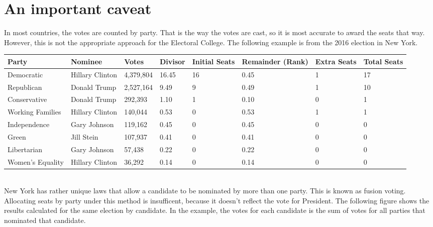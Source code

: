 \documentclass{article}
\begin{document}
    \section{An important caveat}%

    In most countries, the votes are counted by party. That is the way the votes are cast, so it is most accurate to award the seats that way. However, this is not the appropriate approach for the Electoral College. The following example is from the 2016 election in New York.\\

    \begin{adjustbox}{center}
    \begin{tabular}{ |l|l|l|l|l|l|l|l| }
        \hline
        Party & Nominee & Votes & Divisor & Initial Seats & Remainder (Rank) & Extra Seats & Total Seats \\
        \hline
        Democratic & Hillary Clinton & 4,379,804 & 16.45 & 16 & 0.45 & 1 & 17 \\
        \hline
        Republican & Donald Trump & 2,527,164 & 9.49 & 9 & 0.49 & 1 & 10 \\
        \hline
        Conservative & Donald Trump & 292,393 & 1.10 & 1 & 0.10 & 0 & 1 \\
        \hline
        Working Families & Hillary Clinton & 140,044 & 0.53 & 0 & 0.53 & 1 & 1 \\
        \hline
        Independence & Gary Johnson & 119,162 & 0.45 & 0 & 0.45 & 0 & 0 \\
        \hline
        Green & Jill Stein & 107,937 & 0.41 & 0 & 0.41 & 0 & 0 \\
        \hline
        Libertarian & Gary Johnson & 57,438 & 0.22 & 0 & 0.22 & 0 & 0 \\
        \hline
        Women's Equality & Hillary Clinton & 36,292 & 0.14 & 0 & 0.14 & 0 & 0 \\
        \hline
    \end{tabular}
    \end{adjustbox} \\

    New York has rather unique laws that allow a candidate to be nominated by more than one party. This is known as fusion voting. Allocating seats by party under this method is insufficent, because it doesn't reflect the vote for President. The following figure shows the results calculated for the same election by candidate. In the example, the votes for each candidate is the sum of votes for all parties that nominated that candidate.\\
\end{document}
